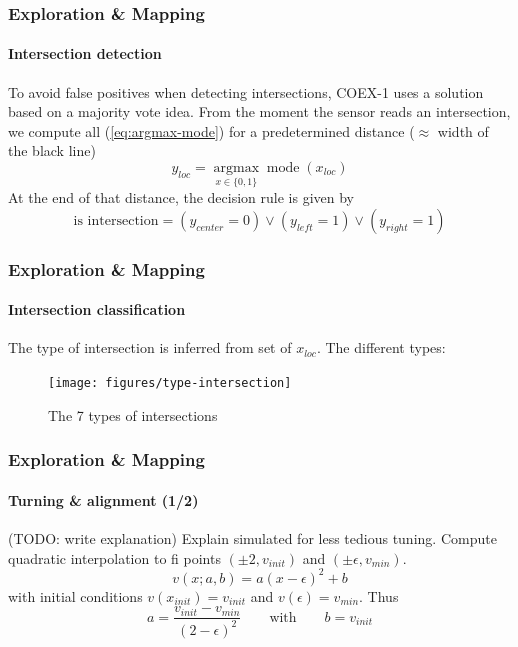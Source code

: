 \documentclass[10pt]{beamer}
\begin{document}

\begin{frame}[label={frame:detect-intersect}]
\frametitle{Exploration \& Mapping}
\framesubtitle{Intersection detection}
To avoid false positives when detecting intersections, COEX-1 uses a solution based on a majority vote idea. From the moment the sensor reads an intersection, we compute all (\ref{eq:argmax-mode}) for a predetermined distance ($\approx$ width of the black line)
\begin{equation}
\label{eq:argmax-mode}
y_{loc} = \underset{x \in  \{0,1\}}{\operatorname{argmax}} \operatorname{mode}(x_{loc})
\end{equation}
At the end of that distance, the decision rule is given by
$$
\text{is intersection} = (y_{center} = 0) \lor (y_{left} = 1) \lor (y_{right} = 1) 
$$
\end{frame}


\begin{frame}
\frametitle{Exploration \& Mapping}
\framesubtitle{Intersection classification}
The type of intersection is inferred from set of $x_{loc}$. The different types:
\begin{figure}[hbtp]
\centering
\texttt{[image: figures/type-intersection]}
\caption{The 7 types of intersections}
\label{fig:type-intersection}
\end{figure}
\end{frame}


\begin{frame}[label={frame:align}]
\frametitle{Exploration \& Mapping}
\framesubtitle{Turning \& alignment (1/2)}
(TODO: write explanation)
Explain simulated for less tedious tuning.
Compute quadratic interpolation to fi points $(\pm2,v_{init})$ and $(\pm\epsilon,v_{min})$.
$$
v(x;a,b) = a(x-\epsilon)^2+b 
$$
with initial conditions $v(x_{init}) = v_{init}$ and $v(\epsilon) = v_{min}$. Thus
$$
a = \frac{v_{init}-v_{min}}{(2-\epsilon)^2}
\qquad\text{with}\qquad
b = v_{init}
$$
\end{frame}
\end{document}
